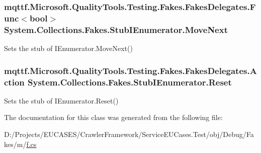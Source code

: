 \hypertarget{class_system_1_1_collections_1_1_fakes_1_1_stub_i_enumerator_aaa94034c19c980ee57926099a8cb2529}{
\subsubsection[{Move\-Next}]{\setlength{\rightskip}{0pt plus 5cm}mqttf.\-Microsoft.\-Quality\-Tools.\-Testing.\-Fakes.\-Fakes\-Delegates.\-Func$<$bool$>$ System.\-Collections.\-Fakes.\-Stub\-I\-Enumerator.\-Move\-Next}}\label{class_system_1_1_collections_1_1_fakes_1_1_stub_i_enumerator_aaa94034c19c980ee57926099a8cb2529}


Sets the stub of I\-Enumerator.\-Move\-Next()

\hypertarget{class_system_1_1_collections_1_1_fakes_1_1_stub_i_enumerator_a275eb0c56a5aae49703766b0009e324e}{
\subsubsection[{Reset}]{\setlength{\rightskip}{0pt plus 5cm}mqttf.\-Microsoft.\-Quality\-Tools.\-Testing.\-Fakes.\-Fakes\-Delegates.\-Action System.\-Collections.\-Fakes.\-Stub\-I\-Enumerator.\-Reset}}\label{class_system_1_1_collections_1_1_fakes_1_1_stub_i_enumerator_a275eb0c56a5aae49703766b0009e324e}


Sets the stub of I\-Enumerator.\-Reset()



The documentation for this class was generated from the following file\-:\begin{DoxyCompactItemize}
\item 
D\-:/\-Projects/\-E\-U\-C\-A\-S\-E\-S/\-Crawler\-Framework/\-Service\-E\-U\-Cases.\-Test/obj/\-Debug/\-Fakes/m/\hyperlink{m_2f_8cs}{f.\-cs}\end{DoxyCompactItemize}
